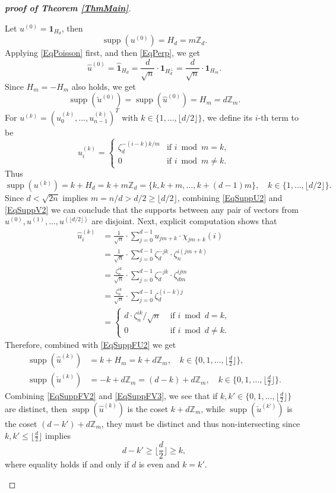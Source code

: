 \documentclass[A4,11pt]{article}
\DeclareMathOperator{\supp}{supp}
\newcommand{\F}[1]{\widehat{\mathbf 1}_{#1}}
\begin{document}
\begin{proof}[\textbf{proof of Theorem \ref{ThmMain}}]
\begin{description}[leftmargin=*]
Let $u^{(0)}=\mathbf 1_{H_d}$, then 
\begin{equation} \label{EqSuppU2}
\supp(u^{(0)})=H_d=m\mathbb Z_d.
\end{equation}
Applying \eqref{EqPoisson} first, and then \eqref{EqPerp}, we get
$$\hat u^{(0)}=\F{H_d}=\frac{d}{\sqrt n}\cdot \mathbf 1_{H_d^{\perp}}=\frac{d}{\sqrt n}\cdot \mathbf 1_{H_m}.$$
Since $H_m=-H_m$ also holds, we get
\begin{equation} \label{EqSuppFU2}
\supp(\check u^{(0)})=\supp(\hat u^{(0)})=H_m=d\mathbb Z_m.
\end{equation}
For $u^{(k)}=(u_0^{(k)},\ldots,u_{n-1}^{(k)})^T$ with $k\in\{1,\ldots,\lfloor d/2\rfloor\}$, we define its $i$-th term to be
$$u_i^{(k)}=\begin{cases}\zeta_d^{-(i-k)k/m} & \text{if } i \bmod m=k, \\ 0 & \text{if } i \bmod m\neq k. \end{cases}$$
Thus
\begin{equation} \label{EqSuppV2}
\supp(u^{(k)})=k+H_d=k+m\mathbb Z_d=\{k,k+m,\ldots,k+(d-1)m\}, \quad k\in\{1,\ldots,\lfloor d/2\rfloor\}.
\end{equation}
Since $d<\sqrt{2n}$ implies $m=n/d>d/2\ge\lfloor d/2\rfloor$, combining \eqref{EqSuppU2} and \eqref{EqSuppV2} we can conclude that the supports between any pair of vectors from $u^{(0)}, u^{(1)}, \ldots, u^{(\lfloor d/2\rfloor)}$ are disjoint. Next, explicit computation shows that
\begin{align*}
\hat u_i^{(k)}&=\frac{1}{\sqrt n}\cdot \sum_{j=0}^{d-1}u_{jm+k}\cdot \chi_{jm+k}(i) \\
&=\frac{1}{\sqrt n}\cdot \sum_{j=0}^{d-1}\zeta_d^{-jk}\cdot\zeta_n^{i(jm+k)} \\
&=\frac{\zeta_n^{ik}}{\sqrt n}\cdot\sum_{j=0}^{d-1}\zeta_d^{-jk}\cdot\zeta_{dm}^{ijm} \\
&=\frac{\zeta_n^{ik}}{\sqrt n}\cdot\sum_{j=0}^{d-1}\zeta_d^{(i-k)j} \\
&=\begin{cases} d\cdot\zeta_n^{ik}/\sqrt n & \text{ if } i \bmod d=k, \\ 0 & \text{ if } i \bmod d\neq k.  \end{cases}
\end{align*}
Therefore, combined with \eqref{EqSuppFU2} we get
\begin{align} 
\supp(\hat u^{(k)})&=k+H_m=k+d\mathbb Z_m, \quad k\in\{0,1,\ldots,\lfloor \frac{d}{2}\rfloor\}, \label{EqSuppFV2} \\
\supp(\check u^{(k)})&=-k+d\mathbb Z_m=(d-k)+d\mathbb Z_m, \quad k\in\{0,1,\ldots,\lfloor \frac{d}{2}\rfloor\}. \label{EqSuppFV3}
\end{align}
Combining \eqref{EqSuppFV2} and \eqref{EqSuppFV3}, we see that if $k,k'\in\{0,1,\ldots,\lfloor \frac{d}{2}\rfloor\}$ are distinct, then $\supp(\hat u^{(k)})$ is the coset $k+d\mathbb Z_m$, while $\supp(\check u^{(k')})$ is the coset $(d-k')+d\mathbb Z_m$, they must be distinct and thus non-intersecting since $k,k'\le \lfloor \frac{d}{2}\rfloor$ implies
$$d-k'\ge\lfloor\frac{d}{2}\rfloor\ge k,$$
where equality holds if and only if $d$ is even and $k=k'$. 


\end{description}
\end{proof}
\end{document}
